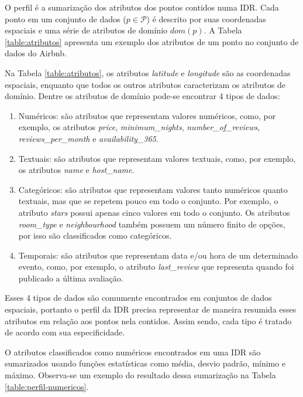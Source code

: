 O perfil é a sumarização dos atributos dos pontos contidos numa IDR. Cada ponto em um conjunto de dados ($p \in \mathcal{P}$) é descrito por suas coordenadas espaciais e uma série de atributos de domínio $dom(p)$. A Tabela \ref{table:atributos} apresenta um exemplo dos atributos de um ponto no conjunto de dados do Airbnb.

Na Tabela \ref{table:atributos}, os atributos {\em latitude} e {\em longitude} são as coordenadas espaciais, enquanto que todos os outros atributos caracterizam os atributos de domínio. Dentre os atributos de domínio pode-se encontrar 4 tipos de dados:

\begin{enumerate}
	\item Numéricos: são atributos que representam valores numéricos, como, por exemplo, os atributos {\em price}, {\em minimum\_nights}, {\em number\_of\_reviews}, {\em reviews\_per\_month} e {\em availability\_365}.
	\item Textuais: são atributos que representam valores textuais, como, por exemplo, os atributos {\em name} e {\em host\_name}.
	\item Categóricos: são atributos que representam valores tanto numéricos quanto textuais, mas que se repetem pouco em todo o conjunto. Por exemplo, o atributo {\em stars} possui apenas cinco valores em todo o conjunto. Os atributos {\em room\_type} e {\em neighbourhood} também possuem um número finito de opções, por isso são classificados como categóricos.
	\item Temporais: são atributos que representam data e/ou hora de um determinado evento, como, por exemplo, o atributo {\em last\_review} que representa quando foi publicado a última avaliação.
\end{enumerate}

Esses 4 tipos de dados são comumente encontrados em conjuntos de dados espaciais, portanto o perfil da IDR precisa representar de maneira resumida esses atributos em relação aos pontos nela contidos. Assim sendo, cada tipo é tratado de acordo com sua especificidade.

O atributos classificados como numéricos encontrados em uma IDR são sumarizados usando funções estatísticas como média, desvio padrão, mínimo e máximo. Observa-se um exemplo do resultado dessa sumarização na Tabela \ref{table:perfil-numericos}.


